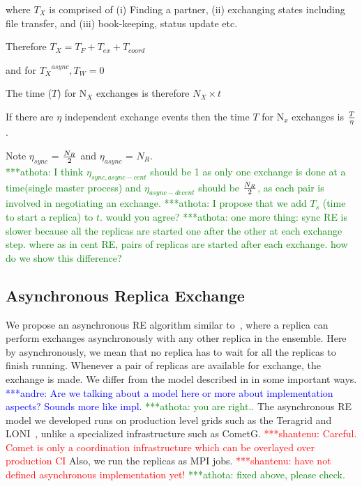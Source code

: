 \documentclass{rspublic}
\newcommand{\jhanote}[1]{ {\textcolor{red} { ***shantenu: #1 }}}
\newcommand{\alnote}[1]{ {\textcolor{blue} { ***andre: #1 }}}
\newcommand{\athotanote}[1]{ {\textcolor{green} { ***athota: #1 }}}
\newcommand{\alnote}[1]{}
\newcommand{\athotanote}[1]{}
\newcommand{\jhanote}[1]{}
\begin{document}
where $T_{X}$ is comprised of (i) Finding a partner, (ii) exchanging
states including file transfer, and (iii) book-keeping, status update
etc. 

Therefore ${T_{X}} = {T_F + T_{ex} + T_{coord}}$ 


and for ${T_{X}}^{async}, T_W = 0$


The time ($T$) for N$_{X}$ exchanges is therefore $N_{X} \times t$

If there are $\eta$ independent exchange events then the time $T$ for 
N$_x$ exchanges is $T \over \eta$.

Note $\eta_{sync}$ = $N_R \over 2$ and $\eta_{async}$ = $N_R $. \\
\athotanote{I think $\eta_{sync,async-cent}$ should be 1 as only one exchange is done at a time(single master process) and $\eta_{async-decent}$ should be $N_R \over 2$, as each pair is involved in negotiating an exchange.}
\athotanote{I propose that we add  $T_{s}$ (time to start a replica) to $t$. would you agree?}
\athotanote{one more thing: sync RE is slower because all the replicas are started one after the other at each exchange step. where as in cent RE, pairs of replicas are started after each exchange. how do we show this difference?}






  
\subsection{Asynchronous Replica Exchange}


We propose an asynchronous RE algorithm similar
to~\citep{parashar_arepex}, where a replica can perform exchanges
asynchronously with any other replica in the ensemble. Here by asynchronously, we mean that no replica has to wait for all the replicas to finish running. Whenever a pair of replicas are available for exchange, the exchange is made. %
We differ from the model described in \citep{parashar_arepex}
in some important ways. \alnote{Are we talking about a model here or 
more about implementation aspects? Sounds more like impl.}\athotanote{you are right..}
The asynchronous RE model we developed runs on
production level grids such as the Teragrid and LONI~\citep{LONI_web},
unlike a specialized infrastructure such as CometG.
\jhanote{Careful. Comet is only a coordination infrastructure which
  can be overlayed over production CI} Also, we run the replicas as
MPI jobs. \jhanote{have not defined asynchronous implementation yet!} \athotanote{fixed above, please check.}
\end{document}
